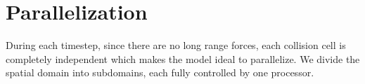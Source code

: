 \section{Parallelization}
During each timestep, since there are no long range forces, each collision cell is completely independent which makes the model ideal to parallelize. We divide the spatial domain into subdomains, each fully controlled by one processor. 
\subsection{}